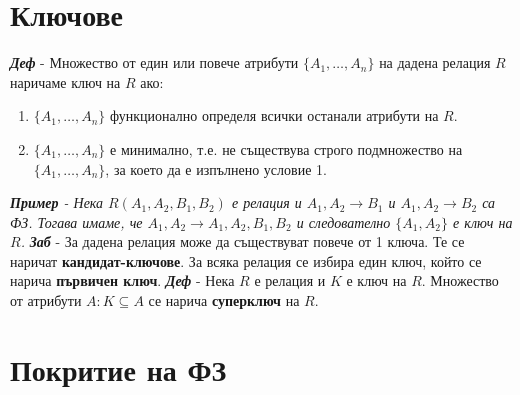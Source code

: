 \documentclass[fleqn,12pt]{article}
\begin{document}
\section{Ключове}

\textbf{\textit{Деф}} - Множество от един или повече атрибути $\{A_1, \dots, A_n\}$ на дадена релация $R$ наричаме ключ на $R$ ако:
\begin{enumerate}
    \item $\{A_1, \dots, A_n\}$ функционално определя всички останали атрибути на $R$.
    \item $\{A_1, \dots, A_n\}$ е минимално, т.е. не съществува строго подмножество на $\{A_1, \dots, A_n\}$, за което да е изпълнено условие 1.
\end{enumerate}
\bigbreak
\textit{\textbf{Пример} - Нека $R(A_1, A_2, B_1, B_2)$ е релация и $A_1, A_2 \rightarrow B_1$ и $A_1, A_2 \rightarrow B_2$ са ФЗ.
Тогава имаме, че $A_1, A_2 \rightarrow A_1, A_2, B_1, B_2$ и следователно $\{A_1, A_2\}$ е ключ на $R$.}
\bigbreak
\textbf{\textit{Заб}} - За дадена релация може да съществуват повече от 1 ключа.
Те се наричат \textbf{кандидат-ключове}.
За всяка релация се избира един ключ, който се нарича \textbf{първичен ключ}.
\bigbreak
\textbf{\textit{Деф}} - Нека $R$ е релация и $K$ е ключ на $R$. Множество от атрибути $A: K \subseteq A$ се нарича \textbf{суперключ} на $R$.

\section{Покритие на ФЗ}
\end{document}
